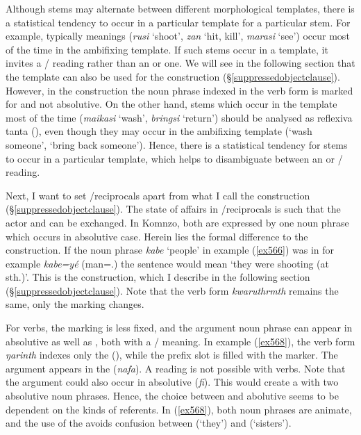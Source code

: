 Although stems may alternate between different morphological templates, there is a statistical tendency to occur in a particular template for a particular stem. For example, typically  meanings (\emph{rusi} `shoot', \emph{zan} `hit, kill', \emph{marasi} `see') occur most of the time in the ambifixing  template. If such stems occur in a  template, it invites a / reading rather than an  or  one. We will see in the following section that the  template can also be used for the  construction ({\S}\ref{suppressedobjectclause}). However, in the  construction the noun phrase indexed in the verb form is marked for   and not absolutive. On the other hand, stems which occur in the  template most of the time (\emph{maikasi} `wash', \emph{bringsi} `return') should be analysed as reflexiva tanta (\citealt{Geniusienie:1987refl}), even though they may occur in the ambifixing  template (`wash someone', `bring back someone'). Hence, there is a statistical tendency for stems to occur in a particular template, which helps to disambiguate between an  or / reading.

Next, I want to set /reciprocals apart from what I call the  construction ({\S}\ref{suppressedobjectclause}). The state of affairs in /reciprocals is such that the actor and  can be exchanged. In Komnzo, both are expressed by one noun phrase which occurs in absolutive case. Herein lies the formal difference to the  construction. If the noun phrase \emph{kabe} `people' in example (\ref{ex566}) was in   \textendash{} for example \emph{kabe=yé} (man=\Erg.{\Nsg}) \textendash{} the sentence would mean `they were shooting (at sth.)'. This is the  construction, which I describe in the following section ({\S}\ref{suppressedobjectclause}). Note that the verb form \emph{kwaruthrmth} remains the same, only the  marking changes.

For  verbs, the  marking is less fixed, and the argument noun phrase can appear in absolutive as well as  , both with a / meaning. In example (\ref{ex568}), the verb form \emph{ŋarinth} indexes only the  (\Stdu), while the prefix slot is filled with the  marker. The  argument appears in the  (\emph{nafa}). A  reading is not possible with  verbs. Note that the argument could also occur in absolutive  (\emph{fi}). This would create a  with two absolutive noun phrases. Hence, the choice between  and abolutive seems to be dependent on the kinds of referents. In (\ref{ex568}), both noun phrases are animate, and the use of the   avoids confusion between  (`they') and  (`sisters').

